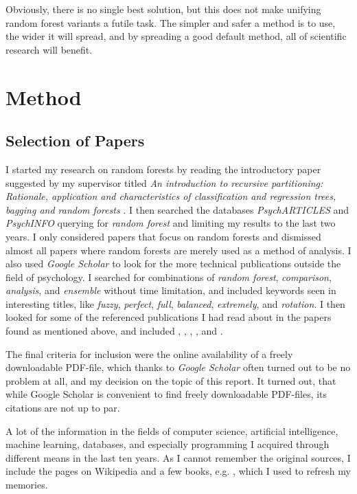 \documentclass[a4paper,man,12pt,apacite,floatsintext]{apa6} %
\begin{document}
Obviously, there is no single best solution, but this does not make unifying
random forest variants a futile task.
The simpler and safer a method is to use, the wider it will spread, and by
spreading a good default method, all of scientific research will benefit.

\newpage
\section{Method}
\subsection{Selection of Papers}
I started my research on random forests by reading the
introductory paper suggested by my supervisor titled
\emph{An introduction to recursive partitioning: Rationale, application
and characteristics of classification and regression trees, bagging and
random forests} \cite{strobl2009introduction}.
I then searched the databases \emph{PsychARTICLES} and
\emph{PsychINFO} querying for \emph{random forest} and limiting my results
to the last two years.
I only considered papers that focus on random forests and
dismissed almost all papers where random forests are merely used as a
method of analysis.
I also used \emph{Google Scholar} to look for the more technical
publications outside the field of psychology.
I searched for combinations of \emph{random forest}, \emph{comparison},
\emph{analysis}, and \emph{ensemble} without time limitation, and
included keywords seen in interesting titles, like \emph{fuzzy},
\emph{perfect}, \emph{full}, \emph{balanced}, \emph{extremely}, and
\emph{rotation}.
I then looked for some of the referenced publications I had read about in the
papers found as mentioned above, and included ,
, , ,
and .

The final criteria for inclusion were the online availability of a freely
downloadable PDF-file, which thanks to \emph{Google Scholar} often turned
out to be no problem at all, and my decision on the topic of
this report.
It turned out, that while Google Scholar is convenient to find freely
downloadable PDF-files, its citations are not up to par.

A lot of the information in the fields of computer science, artificial
intelligence, machine learning, databases, and especially programming
I acquired through different means in the last ten years.
As I cannot remember the original sources, I include the pages
on Wikipedia and a few books, e.g. ,
which I used to refresh my memories.
\end{document}
